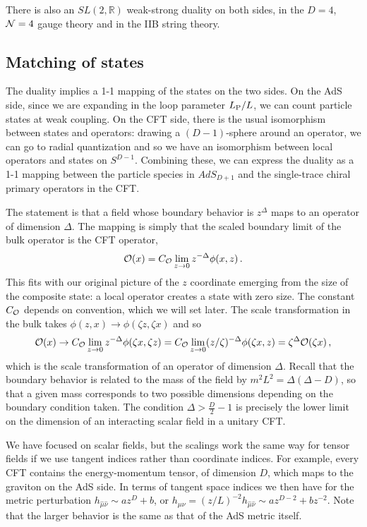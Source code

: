 \documentclass[12pt]{article}
\begin{document}
{There is also an $SL(2,{\mathbb R})$ weak-strong duality on both sides, in the $D=4$, ${\cal N} = 4$ gauge theory and in the IIB string theory.

\subsection{Matching of states}

The duality implies a 1-1 mapping of the states on the two sides.  On the AdS side, since we are expanding in the loop parameter $L_{\rm P}/L$, we can count particle states at weak coupling.  On the CFT side, there is the usual isomorphism between states and operators: drawing a $(D-1)$-sphere around an operator, we can go to radial quantization and so we have an isomorphism between local operators and states on $S^{D-1}$.  Combining these, we can express the duality as a 1-1 mapping between the particle species in $AdS_{D+1}$ and the single-trace chiral primary operators in the CFT.  

The statement is that a field whose boundary behavior is $z^\Delta$ maps to an operator of dimension $\Delta$.  The mapping is simply that the scaled boundary limit of the bulk operator is the CFT operator,
\begin{equation}
{\cal O}(x) = C_{\cal O} \lim_{z\to 0} z^{-\Delta} \phi(x,z) \,. \label{opop}
\end{equation}
This fits with our original picture of the $z$ coordinate emerging from the size of the composite state: a local operator creates a state with zero size.  The constant $C_{\cal O}$ depends on convention, which we will set later.  The scale transformation in the bulk takes  $\phi(z,x) \to \phi(\zeta z, \zeta x) $ and so
\begin{equation}
{\cal O}(x) \to C_{\cal O} \lim_{z\to 0} z^{-\Delta} \phi(\zeta x,\zeta z) = C_{\cal O} \lim_{z\to 0} (z/\zeta)^{-\Delta} \phi(\zeta x, z) =  \zeta^{\Delta} {\cal O}(\zeta x) \,,
\end{equation}
which is the scale transformation of an operator of dimension $\Delta$.  Recall that the boundary behavior is related to the mass of the field by $m^2 L^2 = \Delta(\Delta-D)$, so that a given mass corresponds to two possible dimensions depending on the boundary condition taken.  The condition $\Delta > \frac{D}{2} - 1$ is precisely the lower limit on the dimension of an interacting scalar field in a unitary CFT.

We have focused on scalar fields, but the scalings work the same way for tensor fields if we use tangent indices rather than coordinate indices.
For example, every CFT contains the energy-momentum tensor, of dimension $D$, which maps to the graviton on the AdS side.  In terms of tangent space indices we then have for the metric perturbation $h_{\hat\mu \hat \nu} \sim az^D + b$, or $h_{\mu  \nu} = (z/L)^{-2} h_{\hat\mu \hat \nu} \sim az^{D-2} + bz^{-2}$.  Note that the larger behavior is the same as that of the AdS metric itself.

}
\end{document}
